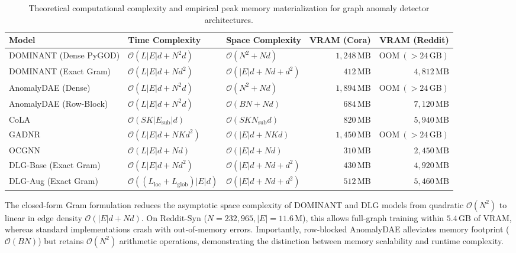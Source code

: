 \documentclass[11pt,a4paper]{article}
\begin{document}
\begin{table}[htbp]
\centering\footnotesize\setlength{\tabcolsep}{3pt}
\caption{Theoretical computational complexity and empirical peak memory materialization for graph anomaly detector architectures.}
\label{tab:complexity_comparison}
\begin{tabularx}{\textwidth}{lXXrr}\toprule
\textbf{Model} & \textbf{Time Complexity} & \textbf{Space Complexity} & \textbf{VRAM (Cora)} & \textbf{VRAM (Reddit)} \\\midrule
DOMINANT (Dense PyGOD) & $\mathcal{O}(L |E| d + N^2 d)$ & $\mathcal{O}(N^2 + N d)$ & $1,248\,\mathrm{MB}$ & $\mathrm{OOM}\ (>24\,\mathrm{GB})$ \\
DOMINANT (Exact Gram) & $\mathcal{O}(L |E| d + N d^2)$ & $\mathcal{O}(|E| d + N d + d^2)$ & $412\,\mathrm{MB}$ & $4,812\,\mathrm{MB}$ \\
AnomalyDAE (Dense) & $\mathcal{O}(L |E| d + N^2 d)$ & $\mathcal{O}(N^2 + N d)$ & $1,894\,\mathrm{MB}$ & $\mathrm{OOM}\ (>24\,\mathrm{GB})$ \\
AnomalyDAE (Row-Block) & $\mathcal{O}(L |E| d + N^2 d)$ & $\mathcal{O}(B N + N d)$ & $684\,\mathrm{MB}$ & $7,120\,\mathrm{MB}$ \\
CoLA & $\mathcal{O}(S K |E_{\mathrm{sub}}| d)$ & $\mathcal{O}(S K N_{\mathrm{sub}} d)$ & $820\,\mathrm{MB}$ & $5,940\,\mathrm{MB}$ \\
GADNR & $\mathcal{O}(L |E| d + N K d^2)$ & $\mathcal{O}(|E| d + N K d)$ & $1,450\,\mathrm{MB}$ & $\mathrm{OOM}\ (>24\,\mathrm{GB})$ \\
OCGNN & $\mathcal{O}(L |E| d + N d)$ & $\mathcal{O}(|E| d + N d)$ & $310\,\mathrm{MB}$ & $2,450\,\mathrm{MB}$ \\
DLG-Base (Exact Gram) & $\mathcal{O}(L |E| d + N d^2)$ & $\mathcal{O}(|E| d + N d + d^2)$ & $430\,\mathrm{MB}$ & $4,920\,\mathrm{MB}$ \\
DLG-Aug (Exact Gram) & $\mathcal{O}((L_{\mathrm{loc}} + L_{\mathrm{glob}}) |E| d)$ & $\mathcal{O}(|E| d + N d + d^2)$ & $512\,\mathrm{MB}$ & $5,460\,\mathrm{MB}$ \\\bottomrule
\end{tabularx}
\end{table}

The closed-form Gram formulation reduces the asymptotic space complexity of DOMINANT and DLG models from quadratic $\mathcal{O}(N^2)$ to linear in edge density $\mathcal{O}(|E| d + N d)$. On Reddit-Syn ($N=232,965, |E|=11.6\,\mathrm{M}$), this allows full-graph training within $5.4\,\mathrm{GB}$ of VRAM, whereas standard implementations crash with out-of-memory errors. Importantly, row-blocked AnomalyDAE alleviates memory footprint ($\mathcal{O}(B N)$) but retains $\mathcal{O}(N^2)$ arithmetic operations, demonstrating the distinction between memory scalability and runtime complexity.
\end{document}
